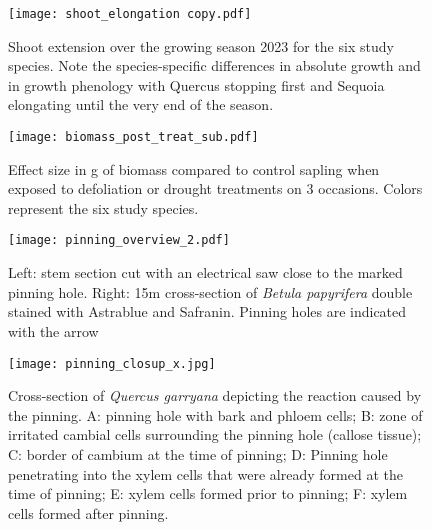 \documentclass{article}
\begin{document}
	
			\begin{figure}[H]
		\centering
		\texttt{[image: shoot\_elongation copy.pdf]} 
		\caption{Shoot extension over the growing season 2023 for the six study species. Note the species-specific differences in absolute growth and in growth phenology with Quercus stopping first and Sequoia elongating until the very end of the season.}
		\label{fig:fig_1xxx}
	\end{figure}
	
	
				\begin{figure}[H]
		\centering
		\texttt{[image: biomass\_post\_treat\_sub.pdf]} 
		\caption{Effect size in g of biomass compared to control sapling when exposed to defoliation or drought treatments on 3 occasions. Colors represent the six study species.}
		\label{fig:fig_1xxx}
	\end{figure}
	
	
	
				\begin{figure}[H]
		\centering
		\texttt{[image: pinning\_overview\_2.pdf]} 
		\caption{Left: stem section cut with an electrical saw close to the marked pinning hole. Right: 15\textmu m cross-section of \textit{Betula papyrifera} double stained with Astrablue and Safranin. Pinning holes are indicated with the arrow}
		\label{fig:fig_1xxx}
	\end{figure}
	
					\begin{figure}[H]
		\centering
		\texttt{[image: pinning\_closup\_x.jpg]} 
		\caption{Cross-section of \textit{Quercus garryana} depicting the reaction caused by the pinning. A: pinning hole with bark and phloem cells; B: zone of irritated cambial cells surrounding the pinning hole (callose tissue); C: border of cambium at the time of pinning; D: Pinning hole penetrating into the xylem cells that were already formed at the time of pinning; E: xylem cells formed prior to pinning; F: xylem cells formed after pinning. }
		\label{fig:fig_1xxx}
	\end{figure}

	
	
	
	
	\newpage
	
	
	
	
	
	
	
	
	
	
\end{document}
